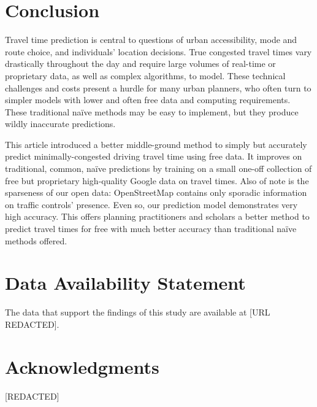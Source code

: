 \documentclass[12pt,letterpaper]{article} %
\begin{document}
\section{Conclusion}

Travel time prediction is central to questions of urban accessibility, mode and route choice, and individuals' location decisions. True congested travel times vary drastically throughout the day and require large volumes of real-time or proprietary data, as well as complex algorithms, to model. These technical challenges and costs present a hurdle for many urban planners, who often turn to simpler models with lower and often free data and computing requirements. These traditional naïve methods may be easy to implement, but they produce wildly inaccurate predictions.

This article introduced a better middle-ground method to simply but accurately predict minimally-congested driving travel time using free data. It improves on traditional, common, naïve predictions by training on a small one-off collection of free but proprietary high-quality Google data on travel times. Also of note is the sparseness of our open data: OpenStreetMap contains only sporadic information on traffic controls' presence. Even so, our prediction model demonstrates very high accuracy. This offers planning practitioners and scholars a better method to predict travel times for free with much better accuracy than traditional naïve methods offered.

\section*{Data Availability Statement}

The data that support the findings of this study are available at [URL REDACTED].

\section*{Acknowledgments}

[REDACTED]


\setlength{\bibsep}{0.00cm plus 0.05cm} %


\end{document}
